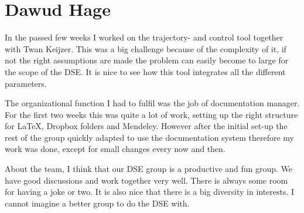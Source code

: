 \section{Dawud Hage}


In the passed few weeks I worked on the trajectory- and control tool together with Twan Keijzer. This was a big challenge because of the complexity of it, if not the right assumptions are made the problem can easily become to large for the scope of the DSE. It is nice to see how this tool integrates all the different parameters.

The organizational function I had to fulfil was the job of documentation manager. For the first two weeks this was quite a lot of work, setting up the right structure for LaTeX, Dropbox folders and Mendeley. However after the initial set-up the rest of the group quickly adapted to use the documentation system therefore my work was done, except for small changes every now and then.

About the team, I think that our DSE group is a productive and fun group. We have good discussions and work together very well. There is always some room for having a joke or two. It is also nice that there is a big diversity in interests. I cannot imagine a better group to do the DSE with.